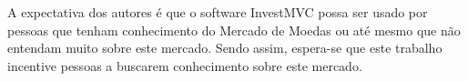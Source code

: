 
A expectativa dos autores é que o software InvestMVC possa ser usado por pessoas que tenham conhecimento do Mercado de Moedas ou até mesmo que não entendam muito sobre este mercado. Sendo assim, espera-se que este trabalho incentive pessoas a buscarem conhecimento sobre este mercado.